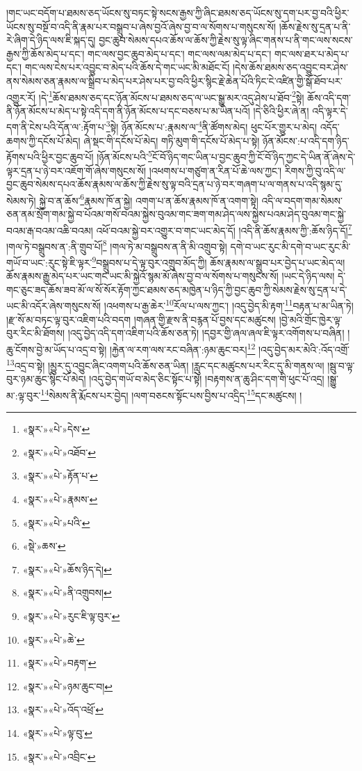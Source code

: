 །གང་ཡང་བདོག་པ་ཐམས་ཅད་ཡོངས་སུ་བཏང་སྟེ་སངས་རྒྱས་ཀྱི་ཞིང་ཐམས་ཅད་ཡོངས་སུ་དག་པར་བྱ་བའི་ཕྱིར་ཡོངས་སུ་བསྔོ་བ་འདི་ནི་རྣམ་པར་བསྒྲུབ་པ་ཞེས་བྱའོ་ཞེས་བྱ་བ་ལ་སོགས་པ་གསུངས་སོ། །ཆོས་རྗེས་སུ་དྲན་པ་ནི་རེ་ཞིག་དེ་ཉིད་ལས་ཇི་སྐད་དུ། བྱང་ཆུབ་སེམས་དཔའ་ཆོས་ལ་ཆོས་ཀྱི་རྗེས་སུ་ལྟ་ཞིང་གནས་པ་ནི་གང་ལས་སངས་རྒྱས་ཀྱི་ཆོས་མེད་པ་དང་། གང་ལས་བྱང་ཆུབ་མེད་པ་དང་། གང་ལས་ལམ་མེད་པ་དང་། གང་ལས་ཐར་པ་མེད་པ་དང་། གང་ལས་ངེས་པར་འབྱུང་བ་མེད་པའི་ཆོས་དེ་གང་ཡང་མི་མཐོང་ངོ། །དེས་ཆོས་ཐམས་ཅད་འབྱུང་བར་ཤེས་ནས་སེམས་ཅན་རྣམས་ལ་སྒྲིབ་པ་མེད་པར་ཤེས་པར་བྱ་བའི་ཕྱིར་སྙིང་རྗེ་ཆེན་པོའི་ཏིང་ངེ་འཛིན་གྱི་སྒོ་ཐོབ་པར་འགྱུར་རོ། །དེ་\footnote{«སྣར་»«པེ་»དེས་}ཆོས་ཐམས་ཅད་དང་ཉོན་མོངས་པ་ཐམས་ཅད་ལ་ཡང་སྒྱུ་མར་འདུ་ཤེས་པ་ཐོབ་\footnote{«སྣར་»«པེ་»འཐོབ་}སྟེ། ཆོས་འདི་དག་ནི་ཉོན་མོངས་པ་མེད་པ་སྟེ་འདི་དག་ནི་ཉོན་མོངས་པ་དང་བཅས་པ་མ་ཡིན་པའོ། །དེ་ཅིའི་ཕྱིར་ཞེ་ན། འདི་ལྟར་དེ་དག་ནི་ངེས་པའི་དོན་ལ་:རྟོག་པ་\footnote{«སྣར་»«པེ་»རྟོན་པ་}སྟེ། ཉོན་མོངས་པ་:རྣམས་ལ་\footnote{«སྣར་»«པེ་»རྣམས་}ནི་ཚོགས་མེད། ཕུང་པོར་གྱུར་པ་མེད། འདོད་ཆགས་ཀྱི་དངོས་པོ་མེད། ཞེ་སྡང་གི་དངོས་པོ་མེད། གཏི་མུག་གི་དངོས་པོ་མེད་པ་སྟེ། ཉོན་མོངས་:པ་འདི་དག་ཉིད་རྟོགས་པའི་ཕྱིར་བྱང་ཆུབ་པོ། །ཉོན་མོངས་པའི་\footnote{«སྣར་»«པེ་»པའི་}ངོ་བོ་ཉིད་གང་ཡིན་པ་བྱང་ཆུབ་ཀྱི་ངོ་བོ་ཉིད་ཀྱང་དེ་ཡིན་ནོ་ཞེས་དེ་ལྟར་དྲན་པ་ཉེ་བར་འཇོག་གོ་ཞེས་གསུངས་སོ། །འཕགས་པ་གཙུག་ན་རིན་པོ་ཆེ་ལས་ཀྱང་། རིགས་ཀྱི་བུ་འདི་ལ་བྱང་ཆུབ་སེམས་དཔའ་ཆོས་རྣམས་ལ་ཆོས་ཀྱི་རྗེས་སུ་ལྟ་བའི་དྲན་པ་ཉེ་བར་གཞག་པ་ལ་གནས་པ་འདི་སྙམ་དུ་སེམས་ཏེ། སྐྱེ་བ་ན་ཆོས་\footnote{«སྡེ་»ཆས་}རྣམས་ཁོ་ན་སྐྱེ། འགག་པ་ན་ཆོས་རྣམས་ཁོ་ན་འགག་སྟེ། འདི་ལ་བདག་གམ་སེམས་ཅན་ནམ་སྲོག་གམ་སྐྱེ་བ་པོའམ་གསོ་བའམ་སྐྱེས་བུའམ་གང་ཟག་གམ་ཤེད་ལས་སྐྱེས་པའམ་ཤེད་བུའམ་གང་སྐྱེ་བའམ་རྒ་བའམ་འཆི་བའམ། འཕོ་བའམ་སྐྱེ་བར་འགྱུར་བ་གང་ཡང་མེད་དོ། །འདི་ནི་ཆོས་རྣམས་ཀྱི་:ཆོས་ཉིད་དོ།\footnote{«སྣར་»«པེ་»ཆོས་ཉིད་དེ།} །གལ་ཏེ་བསྒྲུབས་ན་:ནི་གྲུབ་པོ།\footnote{«སྣར་»«པེ་»ནི་འགྲུབས།} །གལ་ཏེ་མ་བསྒྲུབས་ན་ནི་མི་འགྲུབ་སྟེ། དགེ་བ་ཡང་རུང་མི་དགེ་བ་ཡང་རུང་མི་གཡོ་བ་ཡང་:རུང་སྟེ་ཇི་ལྟར་\footnote{«སྣར་»«པེ་»རུང་ཇི་ལྟ་བུར་}བསྒྲུབས་པ་དེ་ལྟ་བུར་འགྲུབ་མོད་ཀྱི། ཆོས་རྣམས་ལ་སྒྲུབ་པར་བྱེད་པ་ཡང་མེད་ལ། ཆོས་རྣམས་རྒྱུ་མེད་པར་ཡང་གང་ཡང་མི་སྐྱེའོ་སྙམ་མོ་ཞེས་བྱ་བ་ལ་སོགས་པ་གསུངས་སོ། །ཡང་དེ་ཉིད་ལས། དེ་གང་ཅུང་ཟད་ཆོས་ཟབ་མོ་ལ་སོ་སོར་རྟོག་ཀྱང་ཐམས་ཅད་མཁྱེན་པ་ཉིད་ཀྱི་བྱང་ཆུབ་ཀྱི་སེམས་རྗེས་སུ་དྲན་པ་དེ་ཡང་མི་འདོར་ཞེས་གསུངས་སོ། །འཕགས་པ་རྒྱ་ཆེར་\footnote{«སྣར་»«པེ་»ཆེ་}རོལ་པ་ལས་ཀྱང་། །འདུ་བྱེད་མི་རྟག་\footnote{«སྣར་»«པེ་»བརྟག་}བརྟན་པ་མ་ཡིན་ཏེ། །རྫ་སོ་མ་བཏང་ལྟ་བུར་འཇིག་པའི་བདག །གཞན་གྱི་རྫས་ནི་བརྙན་པོ་བྱས་དང་མཚུངས། །བྱེ་མའི་གྲོང་ཁྱེར་ལྟ་བུར་རིང་མི་ཐོགས། །འདུ་བྱེད་འདི་དག་འཇིག་པའི་ཆོས་ཅན་ཏེ། །དབྱར་གྱི་ཞལ་ཞལ་ཇི་ལྟར་འགོགས་པ་བཞིན། །ཆུ་ངོགས་བྱེ་མ་ཡོད་པ་འདྲ་བ་སྟེ། །རྐྱེན་ལ་རག་ལས་རང་བཞིན་:ཉམ་ཆུང་བར།\footnote{«སྣར་»«པེ་»ཉམ་ཆུང་བ།} །འདུ་བྱེད་མར་མེའི་:འོད་འགྲོ་\footnote{«སྣར་»«པེ་»འོད་འཕྲོ་}འདྲ་བ་སྟེ། །མྱུར་དུ་འབྱུང་ཞིང་འགག་པའི་ཆོས་ཅན་ཡིན། །རླུང་དང་མཚུངས་པར་རིང་དུ་མི་གནས་ལ། །སྦུ་བ་ལྟ་བུར་ཉམ་ཆུང་སྙིང་པོ་མེད། །འདུ་བྱེད་གཡོ་བ་མེད་ཅིང་སྟོང་པ་སྟེ། །བརྟགས་ན་ཆུ་ཤིང་དག་གི་ཕུང་པོ་འདྲ། །སྒྱུ་མ་:ལྟ་བུར་\footnote{«སྣར་»«པེ་»ལྟ་བུ་}སེམས་ནི་རྨོངས་པར་བྱེད། །ལག་བཅངས་སྟོང་པས་བྱིས་པ་འདྲིད་\footnote{«སྣར་»«པེ་»འབྲིང་}དང་མཚུངས། །
